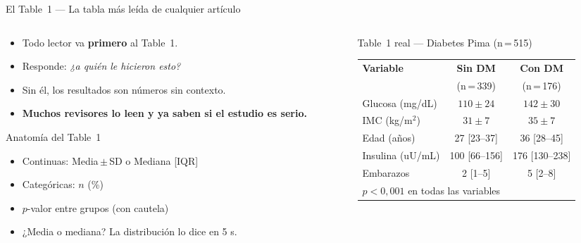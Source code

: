 \documentclass[aspectratio=169,10pt]{beamer}
\begin{document}
\begin{frame}{El Table~1 --- La tabla más leída de cualquier artículo}
  \begin{columns}[T]
    \begin{column}{0.50\textwidth}
      \begin{itemize}\small
        \item Todo lector va \textbf{primero} al Table~1.
        \item Responde: \textit{¿a quién le hicieron esto?}
        \item Sin él, los resultados son números sin contexto.
        \item \textbf{Muchos revisores lo leen y ya saben si el estudio es serio.}
      \end{itemize}
      \vspace{3mm}
      \begin{block}{Anatomía del Table~1}
        \begin{itemize}\scriptsize
          \item Continuas: Media\,$\pm$\,SD \quad o \quad Mediana [IQR]
          \item Categóricas: $n$ (\%)
          \item $p$-valor entre grupos (con cautela)
          \item ¿Media o mediana? La distribución lo dice en 5 s.
        \end{itemize}
      \end{block}
    \end{column}
    \begin{column}{0.47\textwidth}
      \begin{exampleblock}{Table~1 real --- Diabetes Pima (n\,=\,515)}
        \centering\scriptsize
        \renewcommand{\arraystretch}{1.3}
        \begin{tabular}{lcc}
          \toprule
          \textbf{Variable} & \textbf{Sin DM} & \textbf{Con DM} \\
                            & (n\,=\,339) & (n\,=\,176) \\
          \midrule
          Glucosa (mg/dL)   & $110\pm24$       & $142\pm30$ \\
          IMC (kg/m$^2$)    & $31\pm7$         & $35\pm7$ \\
          Edad (años)       & 27 [23--37]      & 36 [28--45] \\
          Insulina (uU/mL)  & 100 [66--156]    & 176 [130--238] \\
          Embarazos         & 2 [1--5]         & 5 [2--8] \\
          \midrule
          \multicolumn{3}{l}{\scriptsize $p<0{,}001$ en todas las variables}\\
          \bottomrule
        \end{tabular}
      \end{exampleblock}
    \end{column}
  \end{columns}
\end{frame}
\end{document}
